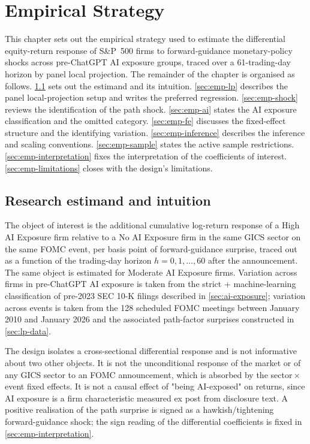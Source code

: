\chapter{Empirical Strategy}
\label{ch:empirical_strategi}

This chapter sets out the empirical strategy used to estimate the differential equity-return response of S\&P~500 firms to forward-guidance monetary-policy shocks across pre-ChatGPT AI exposure groups, traced over a 61-trading-day horizon by panel local projection. The remainder of the chapter is organised as follows. \cref{sec:emp-estimand} sets out the estimand and its intuition. \cref{sec:emp-lp} describes the panel local-projection setup and writes the preferred regression. \cref{sec:emp-shock} reviews the identification of the path shock. \cref{sec:emp-ai} states the AI exposure classification and the omitted category. \cref{sec:emp-fe} discusses the fixed-effect structure and the identifying variation. \cref{sec:emp-inference} describes the inference and scaling conventions. \cref{sec:emp-sample} states the active sample restrictions. \cref{sec:emp-interpretation} fixes the interpretation of the coefficients of interest. \cref{sec:emp-limitations} closes with the design's limitations.

\section{Research estimand and intuition}
\label{sec:emp-estimand}

The object of interest is the additional cumulative log-return response of a High AI Exposure firm relative to a No AI Exposure firm in the same GICS sector on the same FOMC event, per basis point of forward-guidance surprise, traced out as a function of the trading-day horizon $h = 0, 1, \dots, 60$ after the announcement. The same object is estimated for Moderate AI Exposure firms. Variation across firms in pre-ChatGPT AI exposure is taken from the strict + machine-learning classification of pre-2023 SEC 10-K filings described in \cref{sec:ai-exposure}; variation across events is taken from the 128 scheduled FOMC meetings between January 2010 and January 2026 and the associated path-factor surprises constructed in \cref{sec:lp-data}.

The design isolates a cross-sectional differential response and is not informative about two other objects. It is not the unconditional response of the market or of any GICS sector to an FOMC announcement, which is absorbed by the sector\,$\times$\,event fixed effects. It is not a causal effect of "being AI-exposed" on returns, since AI exposure is a firm characteristic measured ex post from disclosure text. A positive realisation of the path surprise is signed as a hawkish/tightening forward-guidance shock; the sign reading of the differential coefficients is fixed in \cref{sec:emp-interpretation}.

